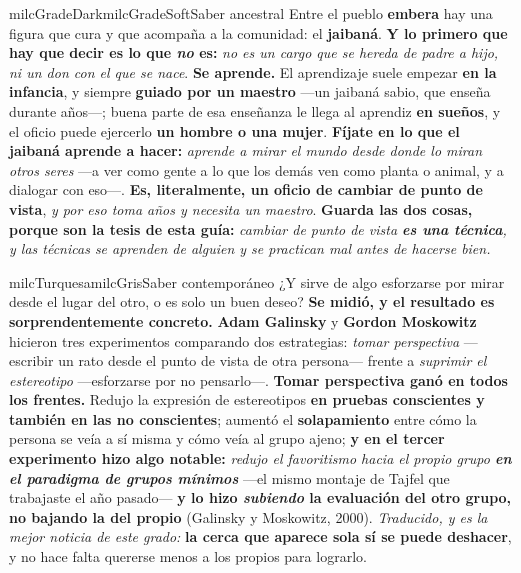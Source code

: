 \documentclass[11pt,letterpaper]{article}
\begin{document}
\begin{softbox}{milcGradeDark}{milcGradeSoft}{Saber ancestral}
Entre el pueblo \textbf{embera} hay una figura que cura y que acompaña a la comunidad: el \textbf{jaibaná}. \textbf{Y lo primero que hay que decir es lo que \emph{no} es:} \emph{no es un cargo que se hereda de padre a hijo, ni un don con el que se nace}. \textbf{Se aprende.} El aprendizaje suele empezar \textbf{en la infancia}, y siempre \textbf{guiado por un maestro} ---un jaibaná sabio, que enseña durante años---; buena parte de esa enseñanza le llega al aprendiz \textbf{en sueños}, y el oficio puede ejercerlo \textbf{un hombre o una mujer}. \textbf{Fíjate en lo que el jaibaná aprende a hacer:} \emph{aprende a mirar el mundo desde donde lo miran otros seres} ---a ver como gente a lo que los demás ven como planta o animal, y a dialogar con eso---. \textbf{Es, literalmente, un oficio de cambiar de punto de vista}, \emph{y por eso toma años y necesita un maestro}. \textbf{Guarda las dos cosas, porque son la tesis de esta guía:} \emph{cambiar de punto de vista \textbf{es una técnica}, y las técnicas se aprenden de alguien y se practican mal antes de hacerse bien.}
\end{softbox}

\begin{softbox}{milcTurquesa}{milcGris}{Saber contemporáneo}
¿Y sirve de algo esforzarse por mirar desde el lugar del otro, o es solo un buen deseo? \textbf{Se midió, y el resultado es sorprendentemente concreto.} \textbf{Adam Galinsky} y \textbf{Gordon Moskowitz} hicieron tres experimentos comparando dos estrategias: \emph{tomar perspectiva} ---escribir un rato desde el punto de vista de otra persona--- frente a \emph{suprimir el estereotipo} ---esforzarse por no pensarlo---. \textbf{Tomar perspectiva ganó en todos los frentes.} Redujo la expresión de estereotipos \textbf{en pruebas conscientes y también en las no conscientes}; aumentó el \textbf{solapamiento} entre cómo la persona se veía a sí misma y cómo veía al grupo ajeno; \textbf{y en el tercer experimento hizo algo notable:} \emph{redujo el favoritismo hacia el propio grupo \textbf{en el paradigma de grupos mínimos}} ---el mismo montaje de Tajfel que trabajaste el año pasado--- \textbf{y lo hizo \emph{subiendo} la evaluación del otro grupo, no bajando la del propio} (Galinsky y Moskowitz, 2000). \emph{Traducido, y es la mejor noticia de este grado:} \textbf{la cerca que aparece sola sí se puede deshacer}, y no hace falta quererse menos a los propios para lograrlo.
\end{softbox}
\end{document}
